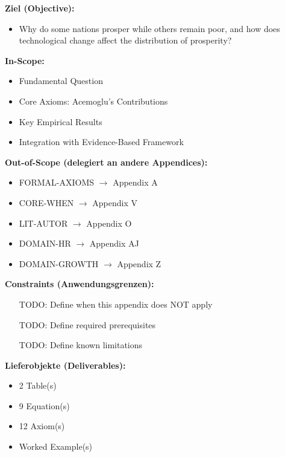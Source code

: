 \begin{tcolorbox}[
    colback=orange!5!white,
    colframe=orange!75!black,
    title={\textbf{Appendix Scope: Ziel / In-Scope / Out-of-Scope / Constraints}},
    fonttitle=\bfseries
]

\textbf{Ziel (Objective):}
\begin{itemize}[nosep]
    \item Why do some nations prosper while others remain poor, and how does technological change affect the distribution of prosperity?
\end{itemize}

\textbf{In-Scope:}
\begin{itemize}[nosep]
    \item Fundamental Question
    \item Core Axioms: Acemoglu's Contributions
    \item Key Empirical Results
    \item Integration with Evidence-Based Framework
\end{itemize}

\textbf{Out-of-Scope (delegiert an andere Appendices):}
\begin{itemize}[nosep]
    \item FORMAL-AXIOMS $\rightarrow$ Appendix A
    \item CORE-WHEN $\rightarrow$ Appendix V
    \item LIT-AUTOR $\rightarrow$ Appendix O
    \item DOMAIN-HR $\rightarrow$ Appendix AJ
    \item DOMAIN-GROWTH $\rightarrow$ Appendix Z
\end{itemize}

\textbf{Constraints (Anwendungsgrenzen):}
\begin{itemize}[nosep]
    \item [TODO: Define when this appendix does NOT apply]
    \item [TODO: Define required prerequisites]
    \item [TODO: Define known limitations]
\end{itemize}

\textbf{Lieferobjekte (Deliverables):}
\begin{itemize}[nosep]
    \item 2 Table(s)
    \item 9 Equation(s)
    \item 12 Axiom(s)
    \item Worked Example(s)
\end{itemize}

\end{tcolorbox}


